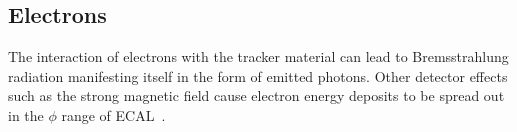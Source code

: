 




\subsection{Electrons}
\label{subsec:electrons}
\hspace{10pt} The interaction of electrons with the tracker material can lead to Bremsstrahlung radiation manifesting itself in the form of emitted photons. Other detector effects such as the strong magnetic field cause electron energy deposits to be spread out in the $\phi$ range of ECAL~\cite{paper:pf_muon_1,note_ele_reco,twiki_egamma_1}. %

